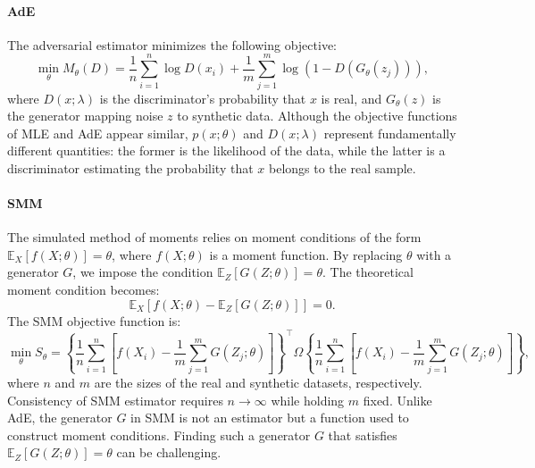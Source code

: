 \documentclass[12pt]{article}
\begin{document}
\paragraph{AdE}
The adversarial estimator minimizes the following objective:
\begin{equation*}
    \min_\theta M_\theta(D) = \frac{1}{n} \sum_{i=1}^n \log D(x_i) + \frac{1}{m} \sum_{j=1}^m \log \left(1 - D(G_\theta(z_j))\right),
\end{equation*}
where \(D(x; \lambda)\) is the discriminator's probability that \(x\) is real, and \(G_\theta(z)\) is the generator mapping noise \(z\) to synthetic data. Although the objective functions of MLE and AdE appear similar, \(p(x; \theta)\) and \(D(x; \lambda)\) represent fundamentally different quantities: the former is the likelihood of the data, while the latter is a discriminator estimating the probability that \(x\) belongs to the real sample.

\paragraph{SMM}
The simulated method of moments relies on moment conditions of the form
\(\mathbb{E}_X[f(X; \theta)] = \theta\), where \(f(X; \theta)\) is a moment
function. By replacing \(\theta\) with a generator \(G\), we impose the
condition \(\mathbb{E}_Z[G(Z; \theta)] = \theta\). The theoretical moment
condition becomes:
\begin{equation*}
    \mathbb{E}_X\left[f(X; \theta) - \mathbb{E}_Z[G(Z; \theta)]\right] = 0.
\end{equation*}
The SMM objective function is:
\begin{equation*}
    \min_\theta S_\theta = \left\{\frac{1}{n}\sum_{i=1}^n \left[f(X_i) - \frac{1}{m} \sum_{j=1}^m G(Z_j; \theta)\right]\right\}^\top \Omega \left\{\frac{1}{n}\sum_{i=1}^n \left[f(X_i) - \frac{1}{m} \sum_{j=1}^m G(Z_j; \theta)\right]\right\},
\end{equation*}
where \(n\) and \(m\) are the sizes of the real and synthetic datasets, respectively. Consistency of SMM estimator requires $n\to\infty$ while holding $m$ fixed. Unlike AdE, the generator \(G\) in SMM is not an estimator but a function used to construct moment conditions. Finding such a generator \(G\) that satisfies \(\mathbb{E}_Z[G(Z; \theta)] = \theta\) can be challenging.
\end{document}
